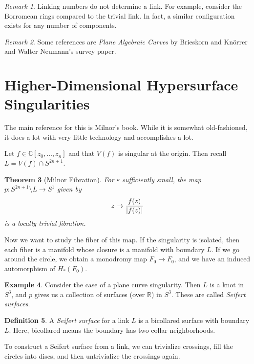 \documentclass[leqno, openany]{memoir}
\newtheorem{thm}{Theorem}[chapter]
\theoremstyle{definition}
\newtheorem{defn}[thm]{Definition}
\newtheorem{exm}[thm]{Example}
\theoremstyle{remark}
\newtheorem{rmk}[thm]{Remark}
\theoremstyle{plain}
\theoremstyle{definition}
\theoremstyle{remark}
\newcommand{\R}{\mathbb{R}}
\newcommand{\C}{\mathbb{C}}
\newcommand{\ep}{\varepsilon}
\begin{document}
\begin{rmk} Linking numbers do not determine a link. For example, consider the
Borromean rings compared to the trivial link. In fact, a similar configuration
exists for any number of components.  \end{rmk}

\begin{rmk} Some references are \textit{Plane Algebraic Curves} by Brieskorn
and Kn\"orrer and Walter Neumann's survey paper.  \end{rmk}

\section{Higher-Dimensional Hypersurface Singularities}%
\label{sec:higher_dimensional_hypersurface_singularities}

The main reference for this is Milnor's book. While it is somewhat
old-fashioned, it does a lot with very little technology and accomplishes a
lot.

Let $f \in \C[z_0, \ldots, z_n]$ and that $V(f)$ is singular at the origin.
Then recall $L = V(f) \cap S^{2n+1}$.

\begin{thm}[Milnor Fibration] For $\ep$ sufficiently small, the map $p:
    S^{2n+1} \setminus {L} \to S^1$ given by \[ z \mapsto
    \frac{f(z)}{\abs{f(z)}} \] is a locally trivial fibration.  \end{thm}

Now we want to study the fiber of this map. If the singularity is isolated,
then each fiber is a manifold whose closure is a manifold with boundary $L$. If
we go around the circle, we obtain a monodromy map $F_0 \to F_0$, and we have
an induced automorphism of $H_*(F_0)$.

\begin{exm} Consider the case of a plane curve singularity. Then $L$ is a knot
in $S^3$, and $p$ gives us a collection of surfaces (over $\R$) in $S^3$. These
are called \textit{Seifert surfaces}.  \end{exm}

\begin{defn} A \textit{Seifert surface} for a link $L$ is a bicollared surface
with boundary $L$. Here, bicollared means the boundary has two collar
neighborhoods.  \end{defn}

To construct a Seifert surface from a link, we can trivialize crossings, fill
the circles into discs, and then untrivialize the crossings again.
\end{document}
